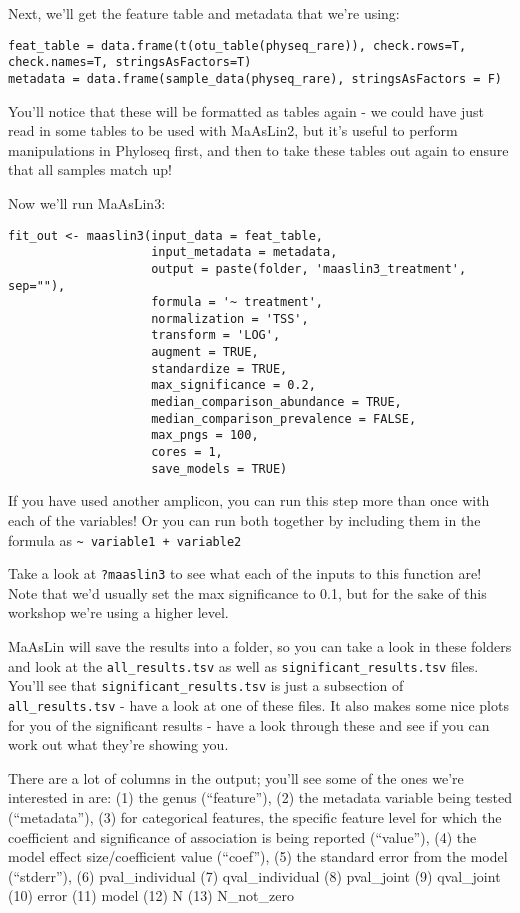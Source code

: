 \documentclass[
]{book}
\begin{document}
Next, we'll get the feature table and metadata that we're using:

\begin{verbatim}
feat_table = data.frame(t(otu_table(physeq_rare)), check.rows=T, check.names=T, stringsAsFactors=T)
metadata = data.frame(sample_data(physeq_rare), stringsAsFactors = F)
\end{verbatim}

You'll notice that these will be formatted as tables again - we could have just read in some tables to be used with MaAsLin2, but it's useful to perform manipulations in Phyloseq first, and then to take these tables out again to ensure that all samples match up!

Now we'll run MaAsLin3:

\begin{verbatim}
fit_out <- maaslin3(input_data = feat_table,
                    input_metadata = metadata,
                    output = paste(folder, 'maaslin3_treatment', sep=""),
                    formula = '~ treatment',
                    normalization = 'TSS',
                    transform = 'LOG',
                    augment = TRUE,
                    standardize = TRUE,
                    max_significance = 0.2,
                    median_comparison_abundance = TRUE,
                    median_comparison_prevalence = FALSE,
                    max_pngs = 100,
                    cores = 1,
                    save_models = TRUE)
\end{verbatim}

If you have used another amplicon, you can run this step more than once with each of the variables! Or you can run both together by including them in the formula as \texttt{\textasciitilde{}\ variable1\ +\ variable2}

Take a look at \texttt{?maaslin3} to see what each of the inputs to this function are! Note that we'd usually set the max significance to 0.1, but for the sake of this workshop we're using a higher level.

MaAsLin will save the results into a folder, so you can take a look in these folders and look at the \texttt{all\_results.tsv} as well as \texttt{significant\_results.tsv} files. You'll see that \texttt{significant\_results.tsv} is just a subsection of \texttt{all\_results.tsv} - have a look at one of these files. It also makes some nice plots for you of the significant results - have a look through these and see if you can work out what they're showing you.

There are a lot of columns in the output; you'll see some of the ones we're interested in are: (1) the genus (``feature''), (2) the metadata variable being tested (``metadata''), (3) for categorical features, the specific feature level for which the coefficient and significance of association is being reported (``value''), (4) the model effect size/coefficient value (``coef''), (5) the standard error from the model (``stderr''), (6)
pval\_individual (7) qval\_individual (8) pval\_joint (9) qval\_joint (10) error (11) model (12) N (13) N\_not\_zero
\end{document}
